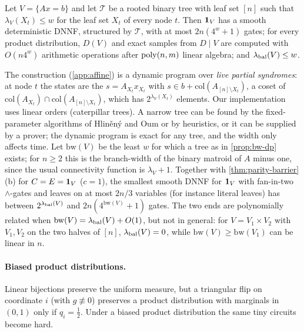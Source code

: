 \begin{proposition}\label{prop:bw-dp}
Let $V=\{Ax=b\}$ and let $\mathcal T$ be a rooted binary tree with leaf set $[n]$ such
that $\lambda_V(X_t)\le w$ for the leaf set $X_t$ of every node $t$. Then $\mathbf{1}_V$ has a
smooth deterministic DNNF, structured by $\mathcal T$, with at most $2n(4^w+1)$ gates;
for every product distribution, $D(V)$ and exact samples from $D\mid V$ are computed
with $O(n4^w)$ arithmetic operations after $\mathrm{poly}(n,m)$ linear algebra; and
$\lambda_{\rm bal}(V)\le w$.
\end{proposition}

The construction (\cref{app:affine}) is a dynamic program over \emph{live partial
syndromes}: at node $t$ the states are the $s=A_{X_t}x_{X_t}$ with $s\in
b+\mathrm{col}(A_{[n]\setminus X_t})$, a coset of $\mathrm{col}(A_{X_t})\cap
\mathrm{col}(A_{[n]\setminus X_t})$, which has $2^{\lambda_V(X_t)}$ elements. Our
implementation uses linear orders (caterpillar trees). A narrow tree can be found by
the fixed-parameter algorithms of Hlin\v{e}n\'y and Oum \cite{hlinenyoum2008} or by
heuristics, or it can be supplied by a prover; the dynamic program is exact for any
tree, and the width only affects time. Let $\mathrm{bw}(V)$ be the least $w$ for
which a tree as in \cref{prop:bw-dp} exists; for $n\ge2$ this is the branch-width of the
binary matroid of $A$ minus one, since the usual connectivity function
\cite{hlinenyoum2008} is $\lambda_V+1$. Together with \cref{thm:parity-barrier}(b) for
$C=E=\mathbf{1}_V$ ($c=1$), the smallest smooth DNNF for $\mathbf{1}_V$ with fan-in-two
$\wedge$-gates and leaves on at most $2n/3$ variables (for instance literal leaves) has
between $2^{\lambda_{\rm bal}(V)}$ and $2n(4^{\mathrm{bw}(V)}+1)$ gates. The two ends are
polynomially related when $\mathrm{bw}(V)=\lambda_{\rm bal}(V)+O(1)$, but not in general: for
$V=V_1\times V_2$ with $V_1,V_2$ on the two halves of $[n]$, $\lambda_{\rm bal}(V)=0$, while
$\mathrm{bw}(V)\ge\mathrm{bw}(V_1)$ can be linear in $n$.

\paragraph{Biased product distributions.}
Linear bijections preserve the uniform measure, but a triangular flip on coordinate $i$
(with $g\not\equiv0$) preserves a product distribution with marginals in $(0,1)$ only if
$q_i=\frac12$. Under a biased product distribution the same tiny circuits become hard.

